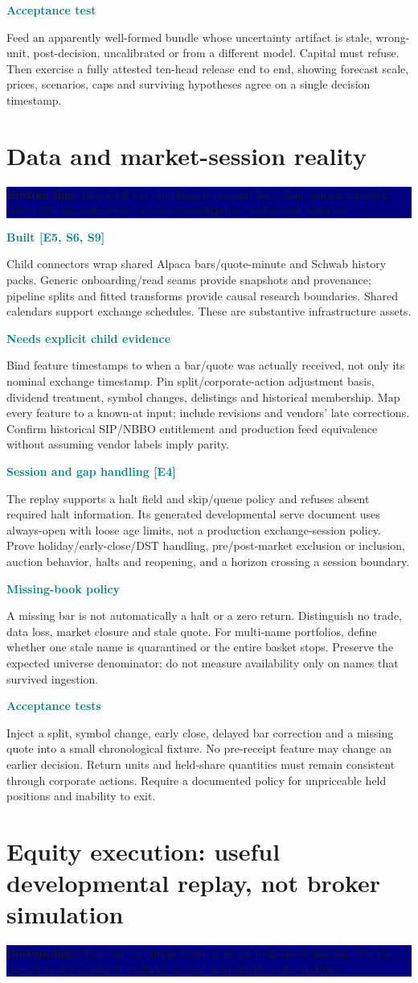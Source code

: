 \documentclass[10pt,letterpaper]{article}
\newcommand{\bl}[1]{\noindent\colorbox{navy}{\parbox{\dimexpr\linewidth-2\fboxsep}{\color{white}\textbf{Bottom line.} #1}}\par\medskip}
\newcommand{\topic}[2]{\clearpage\section{#1}\bl{#2}}
\newcommand{\sub}[1]{\par\textbf{\textcolor{teal}{#1}}\par}
\begin{document}
\sub{Acceptance test}
Feed an apparently well-formed bundle whose uncertainty artifact is stale, wrong-unit, post-decision, uncalibrated or from a different model. Capital must refuse. Then exercise a fully attested ten-head release end to end, showing forecast scale, prices, scenarios, caps and surviving hypotheses agree on a single decision timestamp.
\topic{Data and market-session reality}{Historical bar plumbing is present; bars alone cannot establish executable microstructure or a survivorship-free deployment universe.}
\sub{Built [E5, S6, S9]}
Child connectors wrap shared Alpaca bars/quote-minute and Schwab history packs. Generic onboarding/read seams provide snapshots and provenance; pipeline splits and fitted transforms provide causal research boundaries. Shared calendars support exchange schedules. These are substantive infrastructure assets.
\sub{Needs explicit child evidence}
Bind feature timestamps to when a bar/quote was actually received, not only its nominal exchange timestamp. Pin split/corporate-action adjustment basis, dividend treatment, symbol changes, delistings and historical membership. Map every feature to a known-at input; include revisions and vendors' late corrections. Confirm historical SIP/NBBO entitlement and production feed equivalence without assuming vendor labels imply parity.
\sub{Session and gap handling [E4]}
The replay supports a halt field and skip/queue policy and refuses absent required halt information. Its generated developmental serve document uses always-open with loose age limits, not a production exchange-session policy. Prove holiday/early-close/DST handling, pre/post-market exclusion or inclusion, auction behavior, halts and reopening, and a horizon crossing a session boundary.
\sub{Missing-book policy}
A missing bar is not automatically a halt or a zero return. Distinguish no trade, data loss, market closure and stale quote. For multi-name portfolios, define whether one stale name is quarantined or the entire basket stops. Preserve the expected universe denominator; do not measure availability only on names that survived ingestion.
\sub{Acceptance tests}
Inject a split, symbol change, early close, delayed bar correction and a missing quote into a small chronological fixture. No pre-receipt feature may change an earlier decision. Return units and held-share quantities must remain consistent through corporate actions. Require a documented policy for unpriceable held positions and inability to exit.
\topic{Equity execution: useful developmental replay, not broker simulation}{Next-bar execution avoids a major look-ahead mistake, but the current policy explicitly excludes several unavoidable order realities.}
\end{document}
